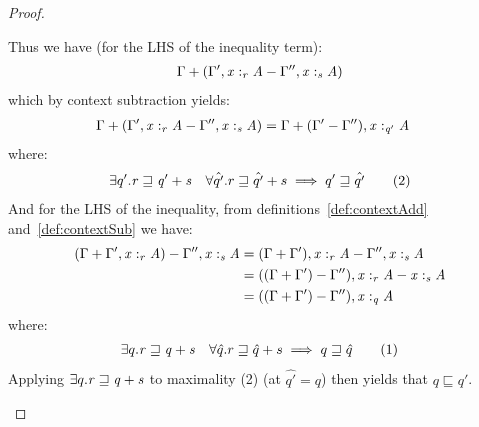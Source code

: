 \begin{proof}
\begin{enumerate}
      Thus we have (for the LHS of the inequality term):
       \begin{align*}
        \Gamma + (\Gamma'  \GRANULEsym{,}   \GRANULEmv{x}  :_{\textcolor{coeffectColor}{  \GRANULEnt{r}  } }   \GRANULEnt{A} - \Gamma''  \GRANULEsym{,}   \GRANULEmv{x}  :_{\textcolor{coeffectColor}{  \GRANULEnt{s}  } }   \GRANULEnt{A})
      \end{align*}
    which by context subtraction yields:
      \begin{align*}
       \Gamma + (\Gamma'  \GRANULEsym{,}   \GRANULEmv{x}  :_{\textcolor{coeffectColor}{  \GRANULEnt{r}  } }   \GRANULEnt{A} - \Gamma''  \GRANULEsym{,}   \GRANULEmv{x}  :_{\textcolor{coeffectColor}{  \GRANULEnt{s}  } }   \GRANULEnt{A}) &= \Gamma + (\Gamma' -
                                                         \Gamma''), \GRANULEmv{x}  :_{\textcolor{coeffectColor}{  \GRANULEnt{q'}  } }   \GRANULEnt{A}
      \end{align*}
      where:
      \begin{align*}
        \exists q' . \GRANULEnt{r} \sqsupseteq \GRANULEnt{q'} + \GRANULEnt{s}
\quad \maximal{q'}{\hat{q'}}{r}{\hat{q'}+s} \qquad (2)
      \end{align*}
       And for the LHS of the inequality, from
       definitions~\ref{def:contextAdd} and~\ref{def:contextSub}
       we have:
      \begin{align*}
        (\Gamma + \Gamma'  \GRANULEsym{,}   \GRANULEmv{x}  :_{\textcolor{coeffectColor}{  \GRANULEnt{r}  } }   \GRANULEnt{A}) - \Gamma''  \GRANULEsym{,}   \GRANULEmv{x}  :_{\textcolor{coeffectColor}{  \GRANULEnt{s}  } }   \GRANULEnt{A} &
= (\Gamma + \Gamma'), \GRANULEmv{x}  :_{\textcolor{coeffectColor}{  \GRANULEnt{r}  } }   \GRANULEnt{A} - \Gamma''  \GRANULEsym{,}   \GRANULEmv{x}  :_{\textcolor{coeffectColor}{  \GRANULEnt{s}  } }   \GRANULEnt{A} \\
  &= ((\Gamma + \Gamma') -  \Gamma''), \GRANULEmv{x}  :_{\textcolor{coeffectColor}{  \GRANULEnt{r}  } }   \GRANULEnt{A} - \GRANULEmv{x}  :_{\textcolor{coeffectColor}{  \GRANULEnt{s}  } }   \GRANULEnt{A} \\
  &= ((\Gamma + \Gamma') -  \Gamma''), \GRANULEmv{x}  :_{\textcolor{coeffectColor}{  \GRANULEnt{q}  } }   \GRANULEnt{A}
      \end{align*}
      where:
      \begin{align*}
        \exists q . \GRANULEnt{r} \sqsupseteq \GRANULEnt{q} + \GRANULEnt{s}
\quad \maximal{q}{\hat{q}}{r}{\hat{q}+s} \qquad (1)
      \end{align*}
    Applying $\exists q . \GRANULEnt{r} \sqsupseteq \GRANULEnt{q} + \GRANULEnt{s}$ to
    maximality (2) (at $\hat{q'} = q$) then yields that $q \sqsubseteq q'$.


\end{enumerate}
\end{proof}
